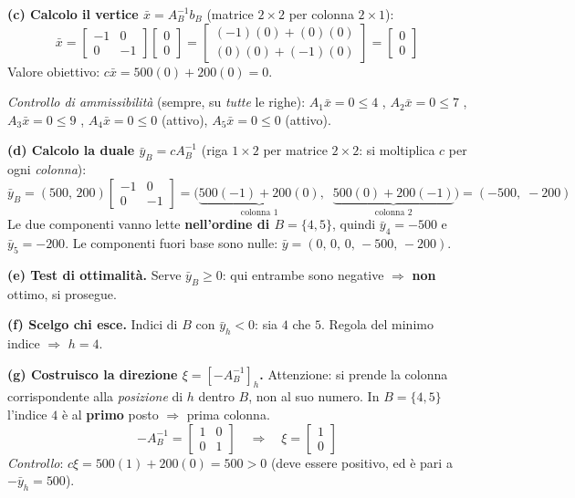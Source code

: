 \documentclass[12pt]{extarticle} %
\begin{document}
\textbf{(c) Calcolo il vertice $\bar{x} = A_B^{-1}b_B$} (matrice $2\times2$ per colonna $2\times1$):
\[
\bar{x} = \begin{bmatrix} -1 & 0\\ 0 & -1\end{bmatrix}\begin{bmatrix} 0\\ 0\end{bmatrix}
= \begin{bmatrix} (-1)(0) + (0)(0)\\ (0)(0) + (-1)(0)\end{bmatrix}
= \begin{bmatrix} 0\\ 0\end{bmatrix}
\]
Valore obiettivo: $c\bar{x} = 500(0) + 200(0) = 0$.

\textit{Controllo di ammissibilità} (sempre, su \emph{tutte} le righe): $A_1\bar{x} = 0 \le 4$ \checkmark, $A_2\bar{x} = 0 \le 7$ \checkmark, $A_3\bar{x} = 0 \le 9$ \checkmark, $A_4\bar{x} = 0 \le 0$ \checkmark (attivo), $A_5\bar{x} = 0 \le 0$ \checkmark (attivo).

\textbf{(d) Calcolo la duale $\bar{y}_B = cA_B^{-1}$} (riga $1\times2$ per matrice $2\times2$: si moltiplica $c$ per ogni \emph{colonna}):
\[
\bar{y}_B = (500,\,200)\begin{bmatrix} -1 & 0\\ 0 & -1\end{bmatrix}
= \big(\underbrace{500(-1) + 200(0)}_{\text{colonna 1}},\;\; \underbrace{500(0) + 200(-1)}_{\text{colonna 2}}\big)
= (-500,\;-200)
\]
Le due componenti vanno lette \textbf{nell'ordine di $B = \{4,5\}$}, quindi $\bar{y}_4 = -500$ e $\bar{y}_5 = -200$. Le componenti fuori base sono nulle: $\bar{y} = (0,\,0,\,0,\,-500,\,-200)$.

\textbf{(e) Test di ottimalità.} Serve $\bar{y}_B \ge 0$: qui entrambe sono negative $\Rightarrow$ \textbf{non} ottimo, si prosegue.

\textbf{(f) Scelgo chi esce.} Indici di $B$ con $\bar{y}_h < 0$: sia $4$ che $5$. Regola del minimo indice $\Rightarrow$ $h = 4$.

\textbf{(g) Costruisco la direzione $\xi = [-A_B^{-1}]_h$.} Attenzione: si prende la colonna corrispondente alla \emph{posizione} di $h$ dentro $B$, non al suo numero. In $B = \{4,5\}$ l'indice $4$ è al \textbf{primo} posto $\Rightarrow$ prima colonna.
\[
-A_B^{-1} = \begin{bmatrix} 1 & 0\\ 0 & 1\end{bmatrix}
\quad\Longrightarrow\quad
\xi = \begin{bmatrix} 1\\ 0\end{bmatrix}
\]
\textit{Controllo}: $c\xi = 500(1) + 200(0) = 500 > 0$ \checkmark (deve essere positivo, ed è pari a $-\bar{y}_h = 500$).
\end{document}
